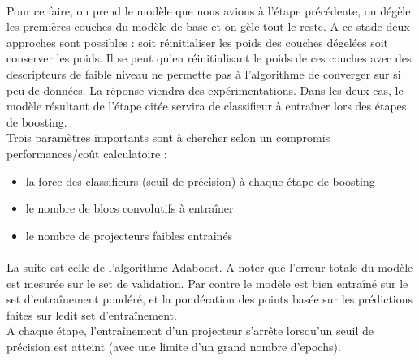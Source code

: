 \documentclass[11 pt]{article}
\begin{document}
\paragraph{}Pour ce faire,  on prend le modèle que nous avions à l’étape précédente, on dégèle les premières couches du modèle de base et on gèle tout le reste. A ce stade deux approches sont possibles : soit réinitialiser les poids des couches dégelées soit conserver les poids. Il se peut qu’en réinitialisant le poids de ces couches avec des descripteurs de faible niveau ne permette pas à l’algorithme de converger sur si peu de données. La réponse viendra des expérimentations. Dans les deux cas, le modèle résultant de l’étape citée servira de classifieur à entraîner lors des étapes de boosting.\\
Trois paramètres importants sont à chercher selon un compromis performances/coût calculatoire :\\ \medskip
\begin{itemize}
  \item la force des classifieurs (seuil de précision) à chaque étape de boosting
  \item le nombre de blocs convolutifs à entraîner
  \item le nombre de projecteurs faibles entraînés
\end{itemize}

\paragraph{}La suite est celle de l’algorithme Adaboost. A noter que l’erreur totale du modèle est mesurée sur le set de validation. Par contre le modèle est bien entraîné sur le set d’entraînement pondéré, et la pondération des points basée sur les prédictions faites sur ledit set d’entraînement.\\
A chaque étape, l’entraînement d’un projecteur s’arrête lorsqu’un seuil de précision est atteint (avec une limite d’un grand nombre d’epochs).
\end{document}
